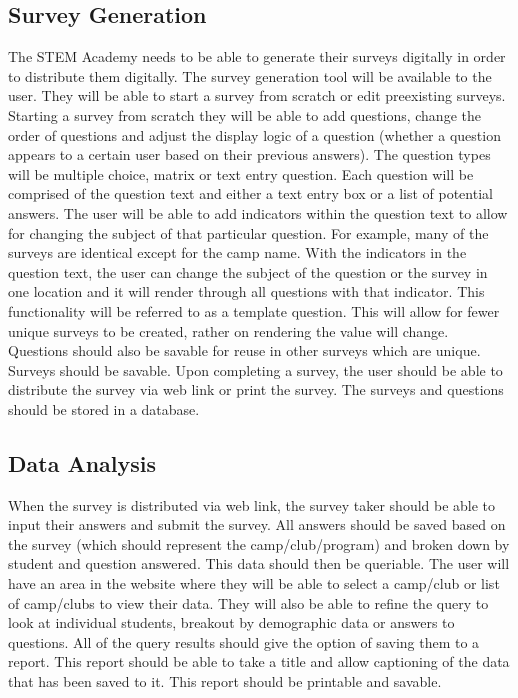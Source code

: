 \documentclass[draftclsnofoot,onecolumn,notitlepage]{article}
\begin{document}
\subsection{Survey Generation}
The STEM Academy needs to be able to generate their surveys digitally in order to distribute them digitally. The survey generation tool will be available to the user. They will be able to start a survey from scratch or edit preexisting surveys. Starting a survey from scratch they will be able to add questions, change the order of questions and adjust the display logic of a question (whether a question appears to a certain user based on their previous answers). The question types will be multiple choice, matrix or text entry question. Each question will be comprised of the question text and either a text entry box or a list of potential answers. The user will be able to add indicators within the question text to allow for changing the subject of that particular question. For example, many of the surveys are identical except for the camp name. With the indicators in the question text, the user can change the subject of the question or the survey in one location and it will render through all questions with that indicator. This functionality will be referred to as a template question. This will allow for fewer unique surveys to be created, rather on rendering the value will change. Questions should also be savable for reuse in other surveys which are unique. Surveys should be savable. Upon completing a survey, the user should be able to distribute the survey via web link or print the survey. The surveys and questions should be stored in a database. 
\subsection{Data Analysis}
When the survey is distributed via web link, the survey taker should be able to input their answers and submit the survey. All answers should be saved based on the survey (which should represent the camp/club/program) and broken down by student and question answered. This data should then be queriable. The user will have an area in the website where they will be able to select a camp/club or list of camp/clubs to view their data. They will also be able to refine the query to look at individual students, breakout by demographic data or answers to questions. All of the query results should give the option of saving them to a report. This report should be able to take a title and allow captioning of the data that has been saved to it. This report should be printable and savable. 
\end{document}
